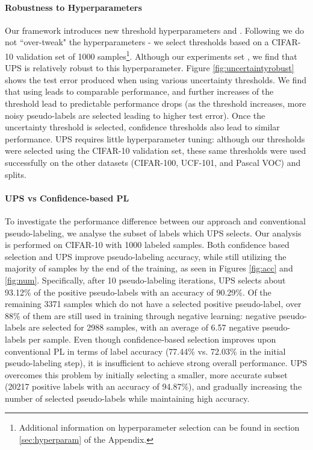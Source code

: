 \documentclass{article} \usepackage{iclr2021_conference,times}
\begin{document}
\paragraph{Robustness to Hyperparameters} Our framework introduces new threshold hyperparameters  and . Following \citep{oliver2018realistic} we do not ``over-tweak" the hyperparameters - we select thresholds based on a CIFAR-10 validation set of 1000 samples\footnote{Additional information on hyperparameter selection can be found in section \ref{sec:hyperparam} of the Appendix.}. Although our experiments set , we find that UPS is relatively robust to this hyperparameter. Figure \ref{fig:uncertaintyrobust} shows the test error produced when using various uncertainty thresholds. We find that using  leads to comparable performance, and further increases of the threshold lead to predictable performance drops (as the threshold increases, more noisy pseudo-labels are selected leading to higher test error). Once the uncertainty threshold is selected, confidence thresholds  also lead to similar performance. UPS requires little hyperparameter tuning: although our thresholds were selected using the CIFAR-10 validation set, these same thresholds were used successfully on the other datasets (CIFAR-100, UCF-101, and Pascal VOC) and splits. 





\paragraph{UPS vs Confidence-based PL} To investigate the performance difference between our approach and conventional pseudo-labeling, we analyse the subset of labels which UPS selects. Our analysis is performed on CIFAR-10 with 1000 labeled samples.
Both confidence based selection and UPS improve pseudo-labeling accuracy, while still utilizing the majority of samples by the end of the training, as seen in Figures \ref{fig:acc} and \ref{fig:num}. Specifically, after 10 pseudo-labeling iterations, UPS selects about 93.12\% of the positive pseudo-labels with an accuracy of 90.29\%. Of the remaining 3371 samples which do not have a selected positive pseudo-label, over 88\% of them are still used in training through negative learning: negative pseudo-labels are selected for 2988 samples, with an average of 6.57 negative pseudo-labels per sample. Even though confidence-based selection improves upon conventional PL in terms of label accuracy (77.44\% vs. 72.03\% in the initial pseudo-labeling step), it is insufficient to achieve strong overall performance. UPS overcomes this problem by initially selecting a smaller, more accurate subset (20217 positive labels with an accuracy of 94.87\%), and gradually increasing the number of selected pseudo-labels while maintaining high accuracy. 
 
\end{document}
